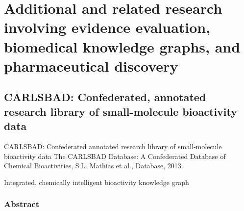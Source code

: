 \chapter{Additional and related research involving evidence evaluation, biomedical knowledge graphs, and pharmaceutical discovery}

\section{CARLSBAD: Confederated, annotated research library of small-molecule bioactivity data}

CARLSBAD: Confederated annotated research library of small-molecule bioactivity data
The CARLSBAD Database: A Confederated Database of Chemical Bioactivities, S.L. Mathias et al., Database, 2013\cite{Mathias2013-hj}.

Integrated, chemically intelligent bioactivity knowledge graph

\subsection{Abstract}

